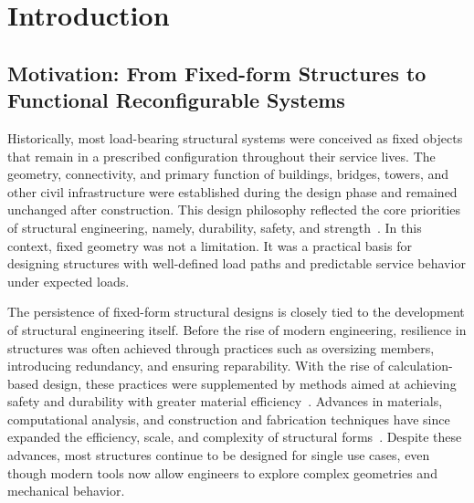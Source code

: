 \chapter{Introduction}\label{chapter-01}
\section{Motivation: From Fixed-form Structures to Functional Reconfigurable Systems}\label{01-sec-motivation}
Historically, most load-bearing structural systems were conceived as fixed objects that remain in a prescribed configuration throughout their service lives. The geometry, connectivity, and primary function of buildings, bridges, towers, and other civil infrastructure were established during the design phase and remained unchanged after construction. This design philosophy reflected the core priorities of structural engineering, namely, durability, safety, and strength~\cite{schneider2006introduction}. In this context, fixed geometry was not a limitation. It was a practical basis for designing structures with well-defined load paths and predictable service behavior under expected loads.

The persistence of fixed-form structural designs is closely tied to the development of structural engineering itself. Before the rise of modern engineering, resilience in structures was often achieved through practices such as oversizing members, introducing redundancy, and ensuring reparability. With the rise of calculation-based design, these practices were supplemented by methods aimed at achieving safety and durability with greater material efficiency~\cite{hassler2014resilience}. Advances in materials, computational analysis, and construction and fabrication techniques have since expanded the efficiency, scale, and complexity of structural forms~\cite{bechthold2017materials}. Despite these advances, most structures continue to be designed for single use cases, even though modern tools now allow engineers to explore complex geometries and mechanical behavior.


